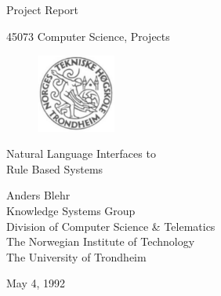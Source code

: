 
\begin{titlepage}
\begin{center}

\vspace*{1in}

{\large Project Report}

\vspace*{0.1in}

{\Large 45073 Computer Science, Projects}

\vspace*{0.8in}
\begin{figure}[h]
  \centering
  \includegraphics[width=0.23\textwidth]{nth.pdf}
\end{figure}

\vspace*{0.8in}

{\Huge Natural Language Interfaces to\\}
\vspace*{0.05in}
{\Huge Rule Based Systems}

\vspace*{0.8in}

{\large Anders Blehr\\
Knowledge Systems Group\\
Division of Computer Science \& Telematics\\
The Norwegian Institute of Technology\\
The University of Trondheim\\
}

\vspace*{0.8in}
May 4, 1992
\vspace*{.5in}
\end{center}
\end{titlepage}
